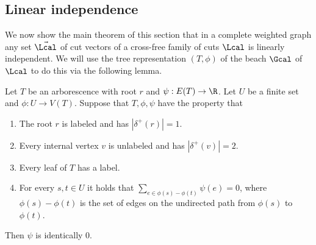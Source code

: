 \subsection{Linear independence}
We now show the main theorem of this section that in a complete weighted graph any set $\vec{\Lcal}$ of cut vectors of a cross-free family of cuts $\Lcal$ is linearly independent.
We will use the tree representation $(T,\phi)$ of the beach $\Gcal$ of $\Lcal$ to do this via the following lemma.
\begin{lemma}
\label{lem:tree_assign}
Let $T$ be an arborescence with root $r$ and $\psi : E(T) \rightarrow \R$.   Let $U$ be a finite set and $\phi: U \rightarrow V(T)$.  Suppose that $T,\phi, \psi$ have the property
that
\begin{enumerate}
  \item The root $r$ is labeled and has $|\delta^+(r)| = 1$.
  \item Every internal vertex $v$ is unlabeled and has $|\delta^+(v)| = 2$.
  \item Every leaf of $T$ has a label.
  \item For every $s,t \in U$ it holds that $\sum_{e \in \phi(s)-\phi(t)} \psi(e) = 0$, where $\phi(s)-\phi(t)$ is the set of edges on the undirected path from $\phi(s)$ to $\phi(t)$.
\end{enumerate}
Then $\psi$ is identically $0$.
\end{lemma}

